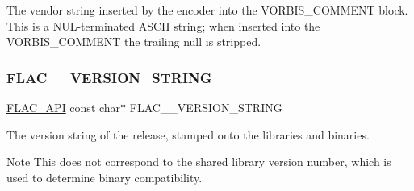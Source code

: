 The vendor string inserted by the encoder into the V\+O\+R\+B\+I\+S\+\_\+\+C\+O\+M\+M\+E\+NT block. This is a N\+U\+L-\/terminated A\+S\+C\+II string; when inserted into the V\+O\+R\+B\+I\+S\+\_\+\+C\+O\+M\+M\+E\+NT the trailing null is stripped. \mbox{\label{group__flac__format_ga1bd3aa4d4ce0393e51dd55bb3e48fbc1}} 
\subsubsection{\texorpdfstring{FLAC\_\_VERSION\_STRING}{FLAC\_\_VERSION\_STRING}}
{\footnotesize\ttfamily \mbox{\hyperlink{group__flac__export_ga56ca07df8a23310707732b1c0007d6f5}{F\+L\+A\+C\+\_\+\+A\+PI}} const char$\ast$ F\+L\+A\+C\+\_\+\+\_\+\+V\+E\+R\+S\+I\+O\+N\+\_\+\+S\+T\+R\+I\+NG}

The version string of the release, stamped onto the libraries and binaries.

\begin{DoxyNote}{Note}
This does not correspond to the shared library version number, which is used to determine binary compatibility. 
\end{DoxyNote}
